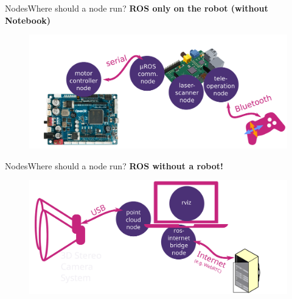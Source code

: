 \documentclass[aspectratio=169]{beamer}
\begin{document}
\begin{frame}{Nodes}{Where should a node run?}
    \textbf{ROS only on the robot (without Notebook)}
      \begin{figure}[tbh!]
        \centering
        \includegraphics[width=.9\textwidth]{./figures/ros_nodes_on_robots.pdf}
      \end{figure}
  \end{frame}
  
  \begin{frame}{Nodes}{Where should a node run?}
    \textbf{ROS without a robot!}
      \begin{figure}[tbh!]
        \centering
        \includegraphics[width=.9\textwidth]{./figures/ros_nodes_example_3.pdf}
      \end{figure}

  \end{frame}
\end{document}
